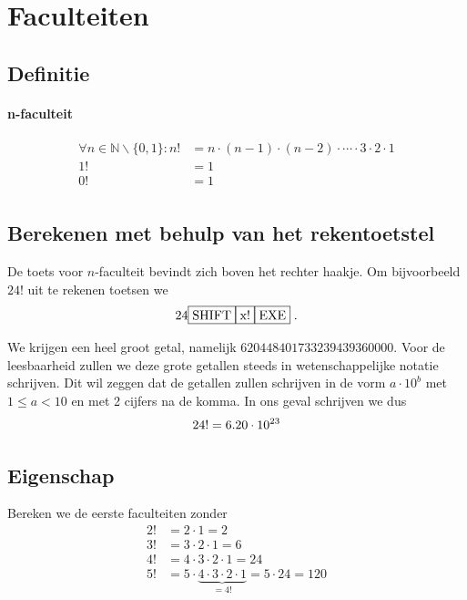 \documentclass[12pt,a4,twoside]{article}
\begin{document}
\pagebreak
\section{Faculteiten}

\subsection{Definitie}

\paragraph*{n-faculteit}
\begin{mdframed}
\begin{align*}
\forall n \in \mathbb{N}\backslash\{0,1\}: n!&=n\cdot(n-1)\cdot(n-2)\cdot \cdots \cdot 3\cdot2\cdot1\\
                           1!&=1\\
                           0!&=1\\
\end{align*}
\end{mdframed}

\subsection{Berekenen met behulp van het rekentoetstel}

De toets voor $n$-faculteit bevindt zich boven het rechter haakje. Om bijvoorbeeld $24!$ uit te rekenen toetsen we
$$24 \zrm{SHIFT} \zrm{x!} \zrm{EXE}\;.$$

We krijgen een heel groot getal, namelijk $620448401733239439360000$. Voor de leesbaarheid zullen we deze grote getallen steeds in wetenschappelijke notatie schrijven. Dit wil zeggen dat de getallen zullen schrijven in de vorm $a \cdot 10^b$ met $1 \leq a < 10$ en met 2 cijfers na de komma. In ons geval schrijven we dus
\[24! = 6.20\cdot 10^{23}\]

\subsection{Eigenschap}

Bereken we de eerste faculteiten zonder 
\begin{align*}
  2! &= 2 \cdot 1 = 2\\
  3! &= 3 \cdot 2 \cdot 1 = 6\\
  4! &= 4 \cdot 3 \cdot 2 \cdot 1 = 24\\
  5! &= 5 \cdot \underbrace{4 \cdot 3 \cdot 2 \cdot 1}_{=4!} = 5 \cdot 24 = 120
\end{align*}
\end{document}
